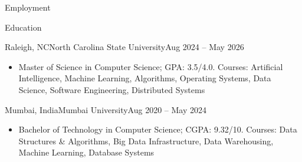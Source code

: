 \documentclass{mcdowellcv}
\begin{document}
\begin{cvsection}{Employment}
\end{cvsection}

\begin{cvsection}{Education}

  \begin{cvsubsection}{Raleigh, NC}{North Carolina State University}{Aug 2024 -- May 2026}
    \begin{itemize}
      \item Master of Science in Computer Science; GPA: 3.5/4.0. Courses: Artificial Intelligence, Machine Learning, Algorithms, Operating Systems, Data Science, Software Engineering, Distributed Systems
    \end{itemize}
  \end{cvsubsection}

  \begin{cvsubsection}{Mumbai, India}{Mumbai University}{Aug 2020 -- May 2024}
    \begin{itemize}
      \item Bachelor of Technology in Computer Science; CGPA: 9.32/10. Courses: Data Structures \& Algorithms, Big Data Infrastructure, Data Warehousing, Machine Learning, Database Systems
    \end{itemize}
  \end{cvsubsection}

\end{cvsection}
\end{document}
